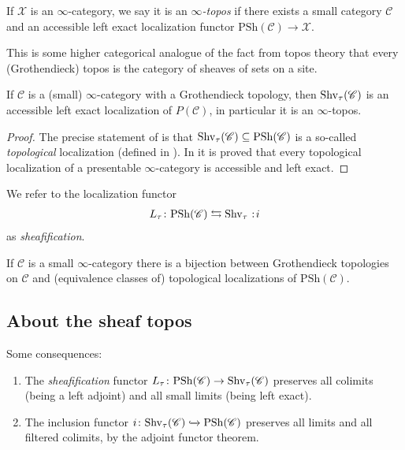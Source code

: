 \documentclass[11pt,openany]{book}
\renewcommand{\Pre}{\mathrm{PSh}}
\begin{document}
\begin{definition} \cite[6.1.0.4]{HTT} If $\mathscr{X}$ is an $\infty$-category, we say it is an $\infty$\textit{-topos} if there exists a small category $\mathscr{C}$ and an accessible left exact localization functor $\Pre(\mathscr{C}) \to \mathscr{X}$.
\end{definition}

This is some higher categorical analogue of the fact from topos theory that every (Grothendieck) topos is the category of sheaves of sets on a site.


\begin{proposition} \cite[6.2.2.7]{HTT} If $\mathscr{C}$ is a (small) $\infty$-category with a Grothendieck topology,  then $\mathrm{Shv}_\tau(\mathscr{C})$ is an accessible left exact localization of $P(\mathscr{C})$, in particular it is an $\infty$-topos.
\end{proposition}
\begin{proof} The precise statement of \cite[6.2.2.7]{HTT} is that $\Shv_\tau(\mathscr{C}) \subseteq \Pre(\mathscr{C})$ is a so-called \textit{topological} localization (defined in \cite[6.2.1.4]{HTT}). In \cite[6.2.1.6]{HTT} it is proved that every topological localization of a presentable $\infty$-category is accessible and left exact.
\end{proof}


\begin{terminology} We refer to the localization functor
\begin{align*}
    L_\tau \colon \Pre(\mathscr{C}) \leftrightarrows \Shv_\tau \noloc i
\end{align*}
as \textit{sheafification}.
\end{terminology}

\begin{proposition} \cite[6.2.2.17]{HTT} If $\mathscr{C}$ is a small $\infty$-category there is a bijection between Grothendieck topologies on $\mathscr{C}$ and (equivalence classes of) topological localizations of $\Pre(\mathscr{C})$.
\end{proposition}

\subsection{About the sheaf topos}

\begin{corollary}\label{cor:properties-sheafification} 
Some consequences:
\begin{enumerate}
    \item The \textit{sheafification} functor $L_\tau \colon \Pre(\mathscr{C}) \to \Shv_\tau(\mathscr{C})$ preserves all colimits (being a left adjoint) and all small limits (being left exact).

    \item The inclusion functor $i \colon \Shv_\tau(\mathscr{C}) \hookto \Pre(\mathscr{C})$ preserves all limits and all filtered colimits, by the adjoint functor theorem.
\end{enumerate}
\end{corollary}
\end{document}
